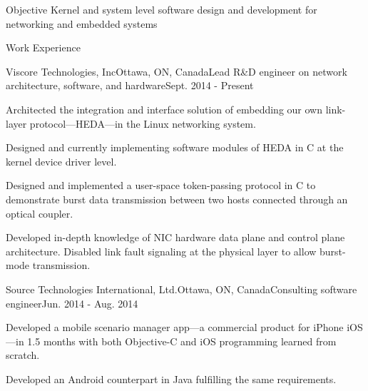 \documentclass{resume} %
\begin{document}

\begin{rSection}{Objective}
Kernel and system level software design and development for networking and embedded systems
\end{rSection}


\begin{rSection}{Work Experience}

\begin{rSubsection}{Viscore Technologies, Inc}{Ottawa, ON, Canada}{Lead R\&D engineer on network architecture, software, and hardware}{Sept. 2014 - Present}
\item Architected the integration and interface solution of embedding our own link-layer protocol---HEDA---in the Linux networking system.
\item Designed and currently implementing software modules of HEDA in C at the kernel device driver level.
\item Designed and implemented a user-space token-passing protocol in C to demonstrate burst data transmission between two hosts connected through an optical coupler.
\item Developed in-depth knowledge of NIC hardware data plane and control plane architecture. Disabled link fault signaling at the physical layer to allow burst-mode transmission.
\end{rSubsection}


\begin{rSubsection}{Source Technologies International, Ltd.}{Ottawa, ON, Canada}{Consulting software engineer}{Jun. 2014 - Aug. 2014}
\item Developed a mobile scenario manager app---a commercial product for iPhone iOS---in 1.5 months with both Objective-C and iOS programming learned from scratch.
\item Developed an Android counterpart in Java fulfilling the same requirements.
\end{rSubsection}

\end{rSection}
\end{document}
